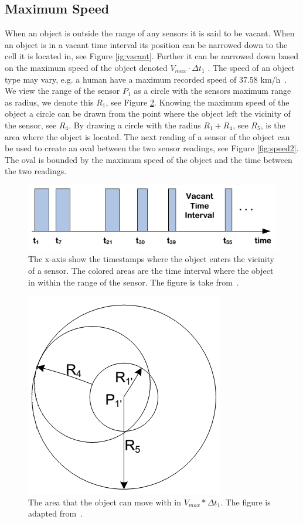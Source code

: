 \subsection{Maximum Speed}
\label{sec:speed}
When an object is outside the range of any sensors it is said to be vacant.
When an object is in a vacant time interval its position can be narrowed down to the cell it is located in, see Figure \ref{ig:vacant}. 
Further it can be narrowed down based on the maximum speed of the object denoted $V_{max}\cdot\Delta t_1$ . 
The speed of an object type may vary, e.g. a human have a maximum recorded speed of 37.58 km/h~\cite{bolt}.
We view the range of the sensor $P_1$ as a circle with the sensors maximum range as radius, we denote this $R_1$, see Figure \ref{fig:speed1}.
Knowing the maximum speed of the object a circle can be drawn from the point where the object left the vicinity of the sensor, see $R_4$.
By drawing a circle with the radius $R_1 + R_4$, see $R_5$, is the area where the object is located. 
The next reading of a sensor of the object can be used to create an oval between the two sensor readings, see Figure \ref{fig:speed2}.  
The oval is bounded by the maximum speed of the object and the time between the two readings. 

\begin{figure}%
\centering
\includegraphics[width=\columnwidth]{images/vacant.png}%
\caption{The x-axis show the timestamps where the object enters the vicinity of a sensor. The colored areas are the time interval where the object in within the range of the sensor. The figure is take from~\cite{Jensen:2009:GMB:1590953.1591000}.}%
\label{fig:vacant}%
\end{figure}

\begin{figure}%
\centering
\includegraphics[width=0.5\columnwidth]{images/speed.png}%
\caption{The area that the object can move with in $V_{max}*\Delta t_1$. The figure is adapted from~\cite{Jensen:2009:GMB:1590953.1591000}.}%
\label{fig:speed1}%
\end{figure}

